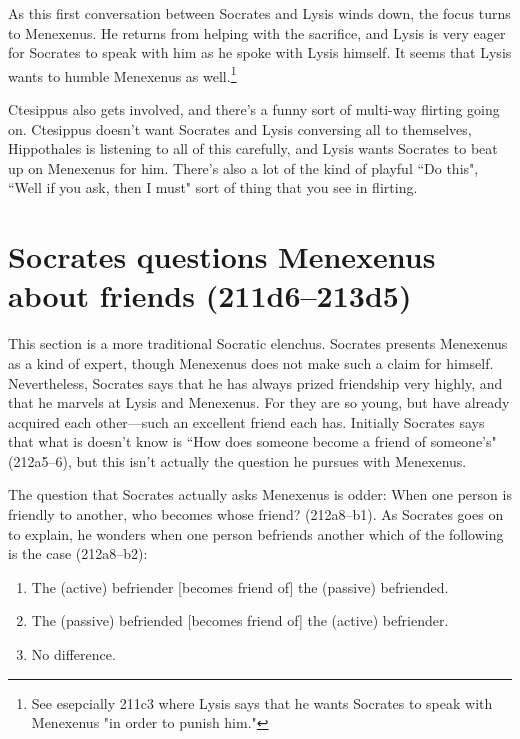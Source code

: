 \documentclass[11pt]{article}
\begin{document}
As this first conversation between Socrates and Lysis winds down, the focus
turns to Menexenus.  He returns from helping with the sacrifice, and Lysis
is very eager for Socrates to speak with him as he spoke with Lysis
himself.  It seems that Lysis wants to humble Menexenus as well.\footnote
{See esepcially 211c3 where Lysis says that he wants Socrates to speak with
Menexenus "in order to punish him."}

Ctesippus also gets involved, and there's a funny sort of multi-way
flirting going on.  Ctesippus doesn't want Socrates and Lysis conversing
all to themselves, Hippothales is listening to all of this carefully, and
Lysis wants Socrates to beat up on Menexenus for him.  There's also a lot
of the kind of playful ``Do this", ``Well if you ask, then I must" sort of
thing that you see in flirting.


\section{Socrates questions Menexenus about friends (211d6--213d5)}

This section is a more traditional Socratic elenchus.  Socrates presents
Menexenus as a kind of expert, though Menexenus does not make such a claim
for himself.  Nevertheless, Socrates says that he has always prized
friendship very highly, and that he marvels at Lysis and Menexenus. For
they are so young, but have already acquired each other---such an excellent
friend each has.  Initially Socrates says that what is doesn't know is
``How does someone become a friend of someone's" (212a5--6), but this isn't
actually the question he pursues with Menexenus.

The question that Socrates actually asks Menexenus is odder: When one
person is friendly to another, who becomes whose friend? (212a8--b1).  As
Socrates goes on to explain, he wonders when one person befriends another
which of the following is the case (212a8--b2):

\begin{enumerate}

    \item The (active) befriender [becomes friend of] the (passive)
        befriended.

    \item The (passive) befriended [becomes friend of] the (active)
        befriender.

    \item No difference.

\end{enumerate}
\end{document}
